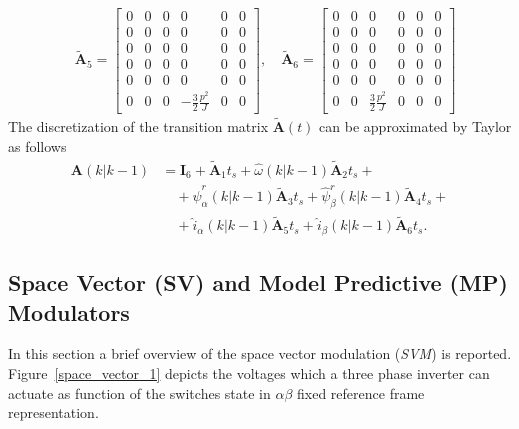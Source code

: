 \documentclass[12pt,a4paper,oneside]{book}
\begin{document}
\begin{onehalfspace}
\begin{equation}
	\begin{aligned}
		&\tilde{\mathbf{A}}_5 = 
		\begin{bmatrix} 
			0 & 0 & 0 & 0 & 0 & 0 \\[6pt]			
			0 & 0 & 0 & 0 & 0 & 0 \\[6pt]
			0 & 0 & 0 & 0 & 0 & 0 \\[6pt]
			0 & 0 & 0 & 0 & 0 & 0 \\[6pt]
			0 & 0 & 0 & 0 & 0 & 0 \\[6pt]
			0 & 0 & 0 & -\frac{3}{2}\frac{p^2}{J} & 0 & 0
		\end{bmatrix},\quad
		\tilde{\mathbf{A}}_6 = 
		\begin{bmatrix} 
			0 & 0 & 0 & 0 & 0 & 0 \\[6pt]			
			0 & 0 & 0 & 0 & 0 & 0 \\[6pt]
			0 & 0 & 0 & 0 & 0 & 0 \\[6pt]
			0 & 0 & 0 & 0 & 0 & 0 \\[6pt]
			0 & 0 & 0 & 0 & 0 & 0 \\[6pt]
			0 & 0 & \frac{3}{2}\frac{p^2}{J} & 0 & 0 & 0
		\end{bmatrix} 
	\end{aligned}
\end{equation} 
The discretization of the transition matrix $\tilde{\mathbf{A}}(t)$ can be 
approximated by Taylor as follows
\begin{equation}\label{}
	\begin{aligned}
		{\mathbf{A}}(k|k-1) &= \mathbf{I}_6 + \tilde{\mathbf{A}}_1t_s + 
		\hat{\omega}(k|k-1) \tilde{\mathbf{A}}_2t_s +\\[8pt]
		&\quad + \hat{\psi}_\alpha^r(k|k-1) \tilde{\mathbf{A}}_3t_s  + \hat{\psi}_\beta^r(k|k-1) \tilde{\mathbf{A}}_4t_s +\\[8pt]
		&\quad + \hat{i}_\alpha(k|k-1) \tilde{\mathbf{A}}_5t_s + \hat{i}_\beta(k|k-1) \tilde{\mathbf{A}}_6t_s.
	\end{aligned}
\end{equation}

\subsection{Space Vector (SV) and Model Predictive (MP) Modulators}	
In this section a brief overview of the space vector modulation (\textit{SVM}) is reported.  Figure~\ref{space_vector_1} depicts the voltages which a three phase inverter can actuate as function of the switches state in $\alpha\beta$ fixed reference frame representation.


\end{onehalfspace}
\end{document}
